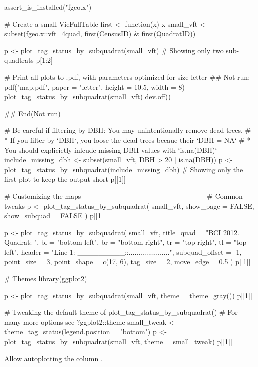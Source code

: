 \documentclass[a4paper]{book}
\begin{document}
\begin{Examples}
\begin{ExampleCode}
assert_is_installed("fgeo.x")

# Create a small VieFullTable
first <- function(x) x %
small_vft <- subset(fgeo.x::vft_4quad, first(CensusID) & first(QuadratID))

p <- plot_tag_status_by_subquadrat(small_vft)
# Showing only two sub-quadtrats
p[1:2]

# Print all plots to .pdf, with parameters optimized for size letter
## Not run: 
pdf("map.pdf", paper = "letter", height = 10.5, width = 8)
plot_tag_status_by_subquadrat(small_vft)
dev.off()

## End(Not run)

# Be careful if filtering by DBH: You may unintentionally remove dead trees.
# * If you filter by `DBH`, you loose the dead trees becaue their `DBH = NA`
# * You should explicietly inlcude missing DBH values with `is.na(DBH)`
include_missing_dbh <- subset(small_vft, DBH > 20 | is.na(DBH))
p <- plot_tag_status_by_subquadrat(include_missing_dbh)
# Showing only the first plot to keep the output short
p[[1]]

# Customizing the maps ----------------------------------------------------
# Common tweaks
p <- plot_tag_status_by_subquadrat(
  small_vft,
  show_page = FALSE,
  show_subquad = FALSE
)
p[[1]]

p <- plot_tag_status_by_subquadrat(
  small_vft,
  title_quad = "BCI 2012. Quadrat: ",
  bl = "bottom-left", br = "bottom-right", tr = "top-right", tl = "top-left",
  header = "Line 1: _________::.....................",
  subquad_offset = -1,
  point_size = 3, point_shape = c(17, 6),
  tag_size = 2,
  move_edge = 0.5
)
p[[1]]

# Themes
library(ggplot2)

p <- plot_tag_status_by_subquadrat(small_vft, theme = theme_gray())
p[[1]]

# Tweaking the default theme of plot_tag_status_by_subquadrat()
# For many more options see ?ggplot2::theme
small_tweak <- theme_tag_status(legend.position = "bottom")
p <- plot_tag_status_by_subquadrat(small_vft, theme = small_tweak)
p[[1]]
\end{ExampleCode}
\end{Examples}
%
\begin{Description}\relax
Allow autoplotting the column .
\end{Description}
\end{document}
